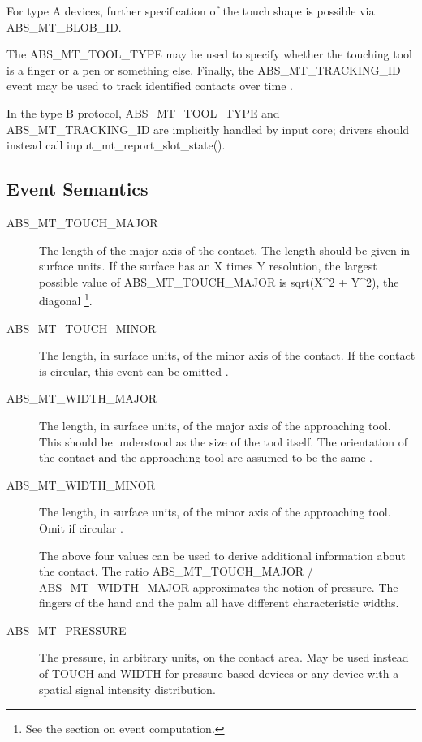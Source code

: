 \documentclass[a4paper,8pt,english]{sphinxmanual}
\begin{document}
For type A devices, further specification of the touch shape is possible
via ABS\_MT\_BLOB\_ID.

The ABS\_MT\_TOOL\_TYPE may be used to specify whether the touching tool is a
finger or a pen or something else. Finally, the ABS\_MT\_TRACKING\_ID event
may be used to track identified contacts over time \footnotemark[5].

In the type B protocol, ABS\_MT\_TOOL\_TYPE and ABS\_MT\_TRACKING\_ID are
implicitly handled by input core; drivers should instead call
input\_mt\_report\_slot\_state().


\subsection{Event Semantics}
\label{input/multi-touch-protocol:event-semantics}\begin{description}
\item[{ABS\_MT\_TOUCH\_MAJOR}] \leavevmode
The length of the major axis of the contact. The length should be given in
surface units. If the surface has an X times Y resolution, the largest
possible value of ABS\_MT\_TOUCH\_MAJOR is sqrt(X\textasciicircum{}2 + Y\textasciicircum{}2), the diagonal \footnote[4]{
See the section on event computation.
}.

\item[{ABS\_MT\_TOUCH\_MINOR}] \leavevmode
The length, in surface units, of the minor axis of the contact. If the
contact is circular, this event can be omitted \footnotemark[4].

\item[{ABS\_MT\_WIDTH\_MAJOR}] \leavevmode
The length, in surface units, of the major axis of the approaching
tool. This should be understood as the size of the tool itself. The
orientation of the contact and the approaching tool are assumed to be the
same \footnotemark[4].

\item[{ABS\_MT\_WIDTH\_MINOR}] \leavevmode
The length, in surface units, of the minor axis of the approaching
tool. Omit if circular \footnotemark[4].

The above four values can be used to derive additional information about
the contact. The ratio ABS\_MT\_TOUCH\_MAJOR / ABS\_MT\_WIDTH\_MAJOR approximates
the notion of pressure. The fingers of the hand and the palm all have
different characteristic widths.

\item[{ABS\_MT\_PRESSURE}] \leavevmode
The pressure, in arbitrary units, on the contact area. May be used instead
of TOUCH and WIDTH for pressure-based devices or any device with a spatial
signal intensity distribution.


\end{description}
\end{document}
